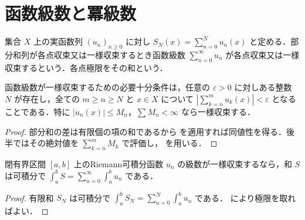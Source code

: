 \section{函数級数と冪級数}
\begin{defn}[函数級数]
集合 $X$ 上の実函数列 $(u_n)_{n\geq0}$ に対し $S_N(x)=\sum_{n=0}^Nu_n(x)$ と定める．部分和列が各点収束又は一様収束するとき函数級数 $\sum_{n=0}^\infty u_n$ が各点収束又は一様収束するという．各点極限をその和という．
\end{defn}
\begin{prop}[函数級数の一様収束判定]
函数級数が一様収束するための必要十分条件は，任意の $\varepsilon>0$ に対しある整数 $N$ が存在し，全ての $m\geq n\geq N$ と $x\in X$ について $|\sum_{k=n}^mu_k(x)|<\varepsilon$ となることである．特に $|u_n(x)|\leq M_n$，$\sum M_n<\infty$ なら一様収束する．
\end{prop}
\begin{proof}
部分和の差は有限個の項の和であるから  を適用すれば同値性を得る．後半ではその絶対値を $\sum_{k=n}^m M_k$ で評価し， を用いる．
\end{proof}
\begin{prop}[函数級数の項別積分]
閉有界区間 $[a,b]$ 上のRiemann可積分函数 $u_n$ の級数が一様収束するなら，和 $S$ は可積分で $\int_a^b S=\sum_{n=0}^\infty\int_a^b u_n$ である．
\end{prop}
\begin{proof}
有限和 $S_N$ は可積分で $\int_a^b S_N=\sum_{n=0}^N\int_a^b u_n$ である． により極限を取ればよい．
\end{proof}
